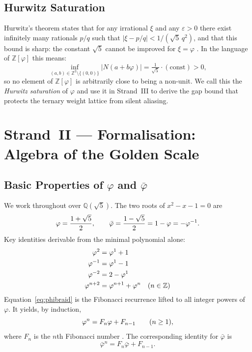 \subsection{Hurwitz Saturation}
\label{subsec:gs-hurwitz-intro}

Hurwitz's theorem states that for any irrational \(\xi\) and any
\(\varepsilon > 0\) there exist infinitely many rationals \(p/q\) such
that \(|\xi - p/q| < 1/(\sqrt{5}\,q^2)\), and that this bound is
sharp: the constant \(\sqrt{5}\) cannot be improved for
\(\xi = \varphi\) \cite{hardy_wright}.  In the language of
\(\mathbb{Z}[\varphi]\) this means:
\[
  \inf_{(a,b) \in \mathbb{Z}^2 \setminus \{(0,0)\}} |N(a+b\varphi)| = \tfrac{1}{\sqrt{5}} \cdot (\text{const}) > 0 ,
\]
so no element of \(\mathbb{Z}[\varphi]\) is arbitrarily close to
being a non-unit.  We call this the \emph{Hurwitz saturation} of
\(\varphi\) and use it in Strand~III to derive the gap bound
that protects the ternary weight lattice from silent aliasing.

\section{Strand~II — Formalisation: Algebra of the Golden Scale}
\label{sec:gs-formalisation}

\subsection{Basic Properties of \(\varphi\) and \(\bar\varphi\)}
\label{subsec:gs-basic}

We work throughout over \(\mathbb{Q}(\sqrt{5})\).  The two roots of
\(x^2 - x - 1 = 0\) are
\[
  \varphi = \frac{1+\sqrt{5}}{2}, \qquad
  \bar\varphi = \frac{1-\sqrt{5}}{2} = 1 - \varphi = -\varphi^{-1} .
\]
Key identities derivable from the minimal polynomial alone:
\begin{align}
  \varphi^{2} &= \varphi^{1} + 1  \label{eq:phi2} \\
  \varphi^{-1} &= \varphi^{1} - 1 \label{eq:phinv} \\
  \varphi^{-2} &= 2 - \varphi^{1} \label{eq:phi-2} \\
  \varphi^{n+2} &= \varphi^{n+1} + \varphi^{n} \quad (n \in \mathbb{Z})
                \label{eq:phibraid}
\end{align}
Equation~\eqref{eq:phibraid} is the Fibonacci recurrence lifted to
all integer powers of~\(\varphi\).  It yields, by induction,
\[
  \varphi^{n} = F_n \varphi + F_{n-1} \qquad (n \ge 1),
\]
where \(F_n\) is the \(n\)th Fibonacci number \cite{koshy_fib_lucas}.
The corresponding identity for \(\bar\varphi\) is
\[
  \bar\varphi^n = F_n \bar\varphi + F_{n-1} .
\]

